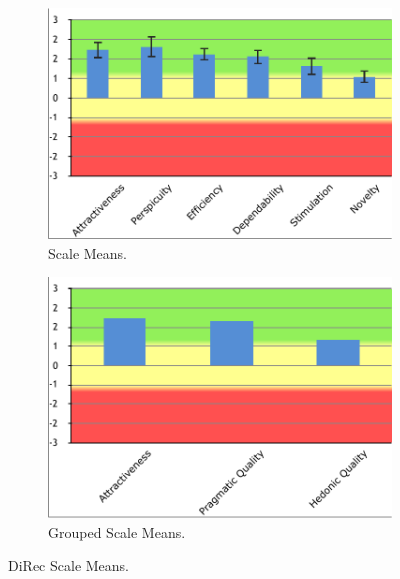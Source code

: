 \begin{figure}[!htbp]
\centering
\begin{subfigure}[b]{0.3\textwidth}
\includegraphics[width=\textwidth]{figures/direc-results}
\caption{Scale Means.}
\label{fig:figure516a}
\end{subfigure}
\begin{subfigure}[b]{0.3\textwidth}
\includegraphics[width=\textwidth]{figures/direc-results2}
\caption{Grouped Scale Means.}
\label{fig:figure516b}
\end{subfigure}
\caption{DiRec Scale Means.}
\label{fig:figure516}
\end{figure}

